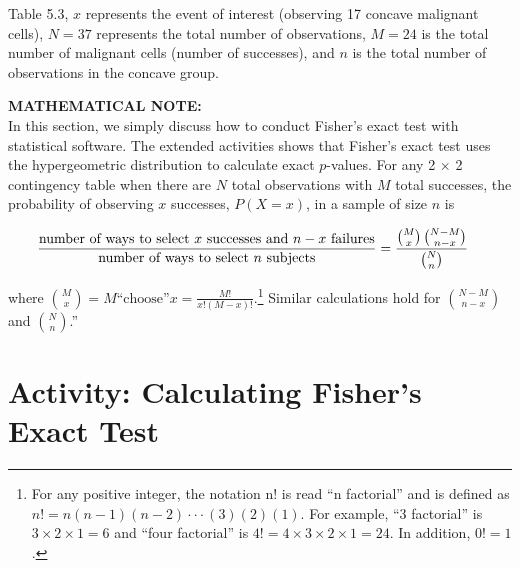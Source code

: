 \documentclass[
]{report}
\begin{document}
Table 5.3, \(x\) represents the event of interest (observing 17 concave malignant cells), \(N = 37\) represents the total number of observations, \(M = 24\) is the total number of malignant cells (number of successes), and \(n\) is the total number of observations in the concave group.

\large

\textbf{MATHEMATICAL NOTE:}\\
In this section, we simply discuss how to conduct Fisher's exact test with statistical software. The extended activities shows that Fisher's exact test uses the hypergeometric distribution to calculate exact \(p\)-values. For any 2 × 2 contingency table when there are \(N\) total observations with \(M\) total successes, the probability of observing \(x\) successes, \(P(X = x)\), in a sample of size \(n\) is
\normalsize

\begin{align}
\frac{\text{number of ways to select $x$ successes and $n - x$ failures}}{\text{number of ways to select $n$ subjects}}
 &= \frac{\binom{M}{x}\,\binom{N - M}{n - x}}{\binom{N}{n}} \notag
\end{align}

where \(\binom{M}{x} = M \text{“choose”} x = \frac{M!}{x!(M - x)!}\).\footnote{For any positive integer, the notation n! is read ``n factorial'' and is defined as \(n!= n(n- 1)(n- 2) \cdot\cdot\cdot (3)(2)(1)\). For example, ``3 factorial'' is \(3 \times 2 \times 1= 6\) and ``four factorial'' is \(4!= 4 \times 3 \times 2 \times 1= 24\). In addition, \(0!= 1\).} Similar calculations hold for \(\binom{N - M}{n - x}\) and \(\binom{N}{n}\).''

\hypertarget{activity-calculating-fishers-exact-test}{%
\section*{Activity: Calculating Fisher's Exact Test}\label{activity-calculating-fishers-exact-test}}
\end{document}
